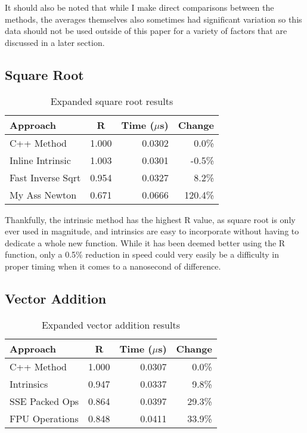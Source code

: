\documentclass{article}
\begin{document}
\vspace{3mm}

It should also be noted that while I make direct comparisons between the methods, the averages themselves also sometimes had significant variation so this data should not be used outside of this paper for a variety of factors that are discussed in a later section.

\subsection{Square Root}

\begin{table}[ht!]
\centering
\begin{tabular}{l|c|r|r}
    Approach        &   R   &   Time ($\mu$s)   &   Change \\
\hline
C++ Method          &  1.000  &  0.0302  &    0.0\%  \\
Inline Intrinsic    &  1.003  &  0.0301  &   -0.5\%  \\
Fast Inverse Sqrt   &  0.954  &  0.0327  &    8.2\%  \\
My Ass Newton       &  0.671  &  0.0666  &  120.4\%  \\
\end{tabular}
\caption{Expanded square root results}
\end{table}

Thankfully, the intrinsic method has the highest R value, as square root is only ever used in magnitude, and intrinsics are easy to incorporate without having to dedicate a whole new function. While it has been deemed better using the R function, only a 0.5\% reduction in speed could very easily be a difficulty in proper timing when it comes to a nanosecond of difference.

\vspace{5mm}

\subsection{Vector Addition}

\begin{table}[ht!]
\centering
\begin{tabular}{l|c|r|r}
    Approach        &   R   &   Time ($\mu$s)   &   Change \\
\hline
C++ Method          &  1.000  &  0.0307  &   0.0\%  \\
Intrinsics          &  0.947  &  0.0337  &   9.8\%  \\
SSE Packed Ops      &  0.864  &  0.0397  &  29.3\%  \\
FPU Operations      &  0.848  &  0.0411  &  33.9\%  \\
\end{tabular}
\caption{Expanded vector addition results}
\end{table}
\end{document}
